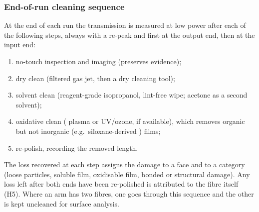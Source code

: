 \subsubsection{End-of-run cleaning sequence}\label{sec:ladder}
At the end of each run the transmission is measured at low power after each of the following steps,
always with a re-peak and first at the output end, then at the input end:
\begin{enumerate}
  \item no-touch inspection and imaging (preserves evidence);
  \item dry clean (filtered gas jet, then a dry cleaning tool);
  \item solvent clean (reagent-grade isopropanol, lint-free wipe; acetone as a second solvent);
  \item oxidative clean (\Oxy{} plasma or UV/ozone, if available), which removes organic but not
        inorganic (e.g.\ siloxane-derived ) films;
  \item re-polish, recording the removed length.
\end{enumerate}
The loss recovered at each step assigns the damage to a face and to a category (loose particles,
soluble film, oxidisable film, bonded or structural damage). Any loss left after both ends have been
re-polished is attributed to the fibre itself (H5). Where an arm has two fibres, one goes through
this sequence and the other is kept uncleaned for surface analysis.

